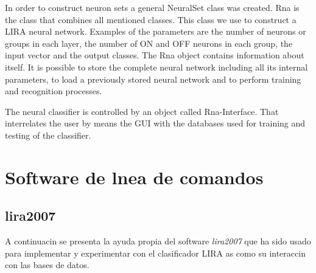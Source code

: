 In order to construct neuron sets a general NeuralSet class was
created. Rna is the class that combines all mentioned classes. This class we use to
construct a LIRA neural network. Examples of the parameters
are the number of neurons or groups in each layer, the number of ON
and OFF neurons in each group, the input vector and the output classes.
The Rna object contains information about itself. It is possible to store
the complete neural network including all its internal parameters,
to load a previously stored neural network and to perform training
and recognition processes. 

The neural classifier is controlled by an object called
Rna-Interface. That interrelates the user by means the GUI with the databases used for training and testing of the classifier. 

\section{Software de lnea de comandos}
\subsection{lira2007}
A continuacin se presenta la ayuda propia del software \emph{lira2007} que ha sido usado para implementar y experimentar con el clasificador LIRA as como su interaccin con las bases de datos.


